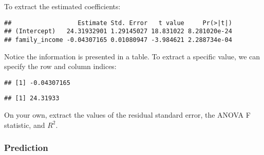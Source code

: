 \documentclass[
]{book}
\newenvironment{Shaded}{\begin{snugshade}}{\end{snugshade}}
\newcommand{\DecValTok}[1]{\textcolor[rgb]{0.00,0.00,0.81}{#1}}
\newcommand{\DocumentationTok}[1]{\textcolor[rgb]{0.56,0.35,0.01}{\textbf{\textit{#1}}}}
\newcommand{\FunctionTok}[1]{\textcolor[rgb]{0.13,0.29,0.53}{\textbf{#1}}}
\newcommand{\NormalTok}[1]{#1}
\newcommand{\SpecialCharTok}[1]{\textcolor[rgb]{0.81,0.36,0.00}{\textbf{#1}}}
\begin{document}
To extract the estimated coefficients:

\begin{Shaded}
\end{Shaded}

\begin{verbatim}
##                  Estimate Std. Error   t value     Pr(>|t|)
## (Intercept)   24.31932901 1.29145027 18.831022 8.281020e-24
## family_income -0.04307165 0.01080947 -3.984621 2.288734e-04
\end{verbatim}

Notice the information is presented in a table. To extract a specific value, we can specify the row and column indices:

\begin{Shaded}
\end{Shaded}

\begin{verbatim}
## [1] -0.04307165
\end{verbatim}

\begin{Shaded}
\end{Shaded}

\begin{verbatim}
## [1] 24.31933
\end{verbatim}

On your own, extract the values of the residual standard error, the ANOVA F statistic, and \(R^2\).

\hypertarget{prediction}{%
\subsubsection*{Prediction}\label{prediction}}
\end{document}
